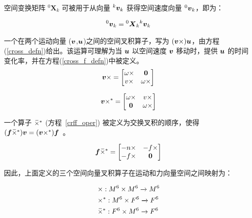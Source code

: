 \documentclass[letterpaper, 10 pt, conference]{ieeetran}  %
\begin{document}
{\noindent 空间变换矩阵 ${}^{0}\boldsymbol{X}_{k}$ 可被用于从向量 ${}^{k}\boldsymbol{v}_{k}$ 获得空间速度向量 ${}^{0}\boldsymbol{v}_{k}$，即为：

\begin{equation}
    {}^{0}\boldsymbol{v}_{k} = {}^{0}\boldsymbol{X}_{k} {}^{k}\boldsymbol{v}_{k}
\end{equation}

\noindent 一个在两个运动向量 ($\boldsymbol{v}$,$\boldsymbol{u}$)之间的空间叉积算子，写为 $(\boldsymbol{v} \times) \boldsymbol{u}$，由方程(\ref{cross_defn})给出。该运算可理解为当 $\boldsymbol{u}$ 以空间速度 $\boldsymbol{v}$ 移动时，提供 $\boldsymbol{u}$ 的时间变化率，并在方程(\ref{cross_f_defn})中被定义。
\begin{align}
    \v \times = \begin{bmatrix}
        \omega \times & \bf{0}  \\
       v \times &  \omega \times
    \end{bmatrix}
    \label{cross_defn}
\end{align}

\begin{align}
    \v \times^* = \begin{bmatrix}
        \omega \times & v \times  \\
        \bf{0} &  \omega \times
    \end{bmatrix}
    \label{cross_f_defn}
\end{align}

\noindent 一个算子 $\,\overline{\!\times\!}{}^{\,*}$ (方程~\ref{crff_oper}) 被定义为交换叉积的顺序，使得 $(\boldsymbol{f} \,\overline{\!\times\!}{}^{\,*}) \boldsymbol{v} = (\boldsymbol{v} \times ^*) \boldsymbol{f} $~\cite{eche}。

\begin{align}
    \f \crff = \begin{bmatrix}
        -n \times & -f \times  \\
        -f \times & \bf{0}
    \end{bmatrix}
    \label{crff_oper}
\end{align}

\noindent 因此，上面定义的三个空间向量叉积算子在运动和力向量空间之间映射为：~\cite{rbd}

\begin{equation}
\begin{aligned}
&    \times : M^{6} \times M^{6} \xrightarrow[]{} M^{6} \\
&    \times^{*} : M^{6} \times F^{6} \xrightarrow[]{} F^{6} \\
&    \,\overline{\!\times\!}{}^{\,*} : F^{6} \times M^{6} \xrightarrow[]{} F^{6}
\end{aligned}
\end{equation}

}
\end{document}
